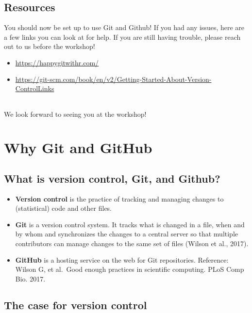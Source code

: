 \documentclass[
]{book}
\providecommand{\tightlist}{%
  \setlength{\itemsep}{0pt}\setlength{\parskip}{0pt}}
\begin{document}
\hypertarget{resources}{%
\section{Resources}\label{resources}}

You should now be set up to use Git and Github! If you had any issues, here are a few links you can look at for help. If you are still having trouble, please reach out to us before the workshop!

\begin{itemize}
\item
  \url{https://happygitwithr.com/}
\item
  \url{https://git-scm.com/book/en/v2/Getting-Started-About-Version-ControlLinks}
\end{itemize}

\strut \\
We look forward to seeing you at the workshop!

\hypertarget{why-git-and-github}{%
\chapter{Why Git and GitHub}\label{why-git-and-github}}

\hypertarget{what-is-version-control-git-and-github}{%
\section{What is version control, Git, and Github?}\label{what-is-version-control-git-and-github}}

\begin{itemize}
\tightlist
\item
  \textbf{Version control} is the practice of tracking and managing changes to
  (statistical) code and other files.
\item
  \textbf{Git} is a version control system. It tracks what is changed in a file,
  when and by whom and synchronizes the changes to a central server so that multiple
  contributors can manage changes to the same set of files (Wilson et al., 2017).
\item
  \textbf{GitHub} is a hosting service on the web for Git repositories.
  Reference: Wilson G, et al.~Good enough practices in scientific computing. PLoS Comp Bio. 2017.
\end{itemize}

\hypertarget{the-case-for-version-control}{%
\section{The case for version control}\label{the-case-for-version-control}}
\end{document}
